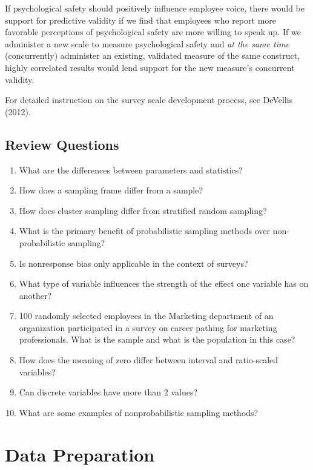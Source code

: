 \documentclass[
]{book}
\begin{document}
If psychological safety should positively influence employee voice, there would be support for predictive validity if we find that employees who report more favorable perceptions of psychological safety are more willing to speak up. If we administer a new scale to measure psychological safety and \emph{at the same time} (concurrently) administer an existing, validated measure of the same construct, highly correlated results would lend support for the new measure's concurrent validity.

For detailed instruction on the survey scale development process, see DeVellis (2012).

\hypertarget{review-questions-3}{%
\section{Review Questions}\label{review-questions-3}}

\begin{enumerate}
\def\labelenumi{\arabic{enumi}.}
\item
  What are the differences between parameters and statistics?
\item
  How does a sampling frame differ from a sample?
\item
  How does cluster sampling differ from stratified random sampling?
\item
  What is the primary benefit of probabilistic sampling methods over non-probabilistic sampling?
\item
  Is nonresponse bias only applicable in the context of surveys?
\item
  What type of variable influences the strength of the effect one variable has on another?
\item
  100 randomly selected employees in the Marketing department of an organization participated in a survey on career pathing for marketing professionals. What is the sample and what is the population in this case?
\item
  How does the meaning of zero differ between interval and ratio-scaled variables?
\item
  Can discrete variables have more than 2 values?
\item
  What are some examples of nonprobabilistic sampling methods?
\end{enumerate}

\hypertarget{data-prep}{%
\chapter{Data Preparation}\label{data-prep}}
\end{document}
